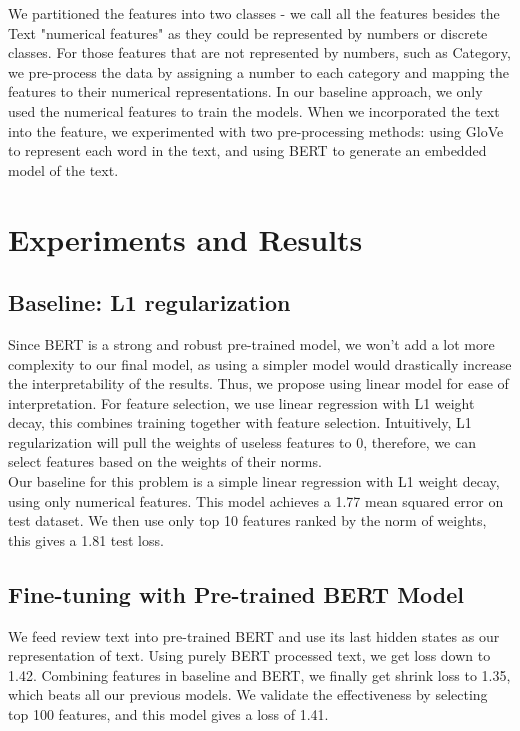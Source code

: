 \documentclass{article}
\begin{document}
We partitioned the features into two classes - we call all the features besides the Text "numerical features" as they could be represented by numbers or discrete classes. For those features that are not represented by numbers, such as Category, we pre-process the data by assigning a number to each category and mapping the features to their numerical representations. In our baseline approach, we only used the numerical features to train the models. When we incorporated the text into the feature, we experimented with two pre-processing methods: using GloVe to represent each word in the text, and using BERT to generate an embedded model of the text. 

\section{Experiments and Results}
\subsection{Baseline: L1 regularization}
Since BERT is a strong and robust pre-trained model, we won’t add a lot more complexity to our final model, as using a simpler model would drastically increase the interpretability of the results. Thus, we propose using linear model for ease of interpretation. For feature selection, we use linear regression with L1 weight decay, this combines training together with feature selection.  Intuitively, L1 regularization will pull the weights of useless features to 0, therefore, we can select features based on the weights of their norms. \\

Our baseline for this problem is a simple linear regression with L1 weight decay, using only numerical features. This model achieves a 1.77 mean squared error on test dataset. We then use only top 10 features ranked by the norm of weights, this gives a 1.81 test loss.

\subsection{Fine-tuning with Pre-trained BERT Model}
 We feed review text into pre-trained BERT and use its last hidden states as our representation of text. Using purely BERT processed text, we get loss down to 1.42. Combining features in baseline and BERT, we finally get shrink loss to 1.35, which beats all our previous models. We validate the effectiveness by selecting top 100 features, and this model gives a loss of 1.41.
\end{document}
